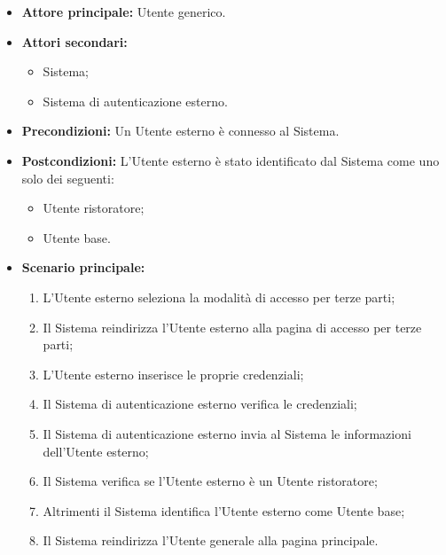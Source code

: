 \label{usecase:Effettua accesso}
\begin{itemize}
	\item \textbf{Attore principale:} Utente generico.
	\item \textbf{Attori secondari:}
	      \begin{itemize}
		      \item Sistema;
		      \item Sistema di autenticazione esterno.
	      \end{itemize}
	\item \textbf{Precondizioni:}
	      Un Utente esterno è connesso al Sistema.
	\item \textbf{Postcondizioni:}
	      L'Utente esterno è stato identificato dal Sistema come uno solo dei seguenti:
	      \begin{itemize}
		      \item Utente ristoratore;
		      \item Utente base.
	      \end{itemize}
	\item \textbf{Scenario principale:}
	      \begin{enumerate}
		      \item L'Utente esterno seleziona la modalità di accesso per terze parti;
		      \item Il Sistema reindirizza l'Utente esterno alla pagina di accesso per terze parti;
		      \item L'Utente esterno inserisce le proprie credenziali;
		      \item Il Sistema di autenticazione esterno verifica le credenziali;
		      \item Il Sistema di autenticazione esterno invia al Sistema le informazioni dell'Utente esterno;
		      \item Il Sistema verifica se l'Utente esterno è un Utente ristoratore;
		      \item Altrimenti il Sistema identifica l'Utente esterno come Utente base;
		      \item Il Sistema reindirizza l'Utente generale alla pagina principale.
	      \end{enumerate}
\end{itemize}
